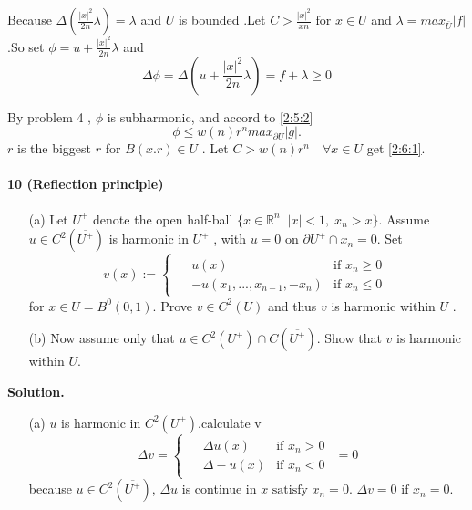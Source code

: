 \documentclass[a4paper]{book}
\newenvironment{solution}%
{\noindent\textbf{Solution.}}%
{\qedhere}
\numberwithin{equation}{chapter}
\theoremstyle{definition}
\begin{document}
\begin{multicols}{2}
Because $\Delta (\frac{|x|^2}{2n}\lambda) = \lambda $ and $U$ is bounded .Let $C > \frac{|x|^2}{xn} \text{ for }x \in U$ and $\lambda = max_{\bar{U}} |f|$ .So set $\phi = u + \frac{|x|^2}{2n} \lambda$ and 
\begin{equation}
	\Delta \phi = \Delta (u + \frac{|x|^2}{2n} \lambda) = f + \lambda \geq 0
\end{equation}

By problem 4 , $\phi$ is subharmonic, and accord to \ref{2:5:2}
\begin{equation}
	\phi \leq w(n)r^n max_{\partial U} |g|.
\end{equation}
$r$ is the biggest $r$ for $ B(x.r) \in U$ . Let $C > w(n)r^n \quad \forall x \in U$ get \ref{2:6:1}.


\paragraph{10 (Reflection principle)}
\begin{itemize}
	\item[(a)] Let $U^+$ denote the open half-ball $ \{x \in \mathbb{R}^n | \; |x| < 1,\; x_n > x\} $. Assume $u \in C^2(\overline{U^+})$ is harmonic in $U^+$ , with $u = 0$ on $ \partial U^+ \cap {x_n = 0}$. Set
	\begin{equation}\label{2:10:1}
	v(x) := 
		\begin{cases}
			\begin{aligned}
				&u(x)         &\text{if } x_n \geq 0\\
				&-u(x_1, ... ,x_{n-1}, -x_n)  &\text{if } x_n \le 0
			\end{aligned}
		\end{cases}
	\end{equation}
	for $x \in U = B^0(0,1)$. Prove $v \in C^2(U)$ and thus $v$ is harmonic within $U$ .
	
	\item[(b)]Now assume only that $u \in C^2(U^+)\cap C(\overline{U^+})$. Show that $v$ is harmonic within $U$. 
\end{itemize}

\begin{solution}
\begin{itemize}
	\item[(a)]$u$ is harmonic in $C^2(U^+)$.calculate v 
	\begin{equation}
		\Delta v =
		\begin{cases}
		\begin{aligned}
		&\Delta u(x)  &\text{if } x_n > 0 \\
		&\Delta -u(x)  &\text{if } x_n < 0
		\end{aligned}
		\end{cases}
		= 0
	\end{equation}
	because $u \in C^2(\overline{U^+})$, $\Delta u$ is continue in $x \text{ satisfy } x_n = 0$. $\Delta v = 0  \text{ if } x_n = 0$.
	

\end{itemize}
\end{solution}
\end{multicols}
\end{document}
